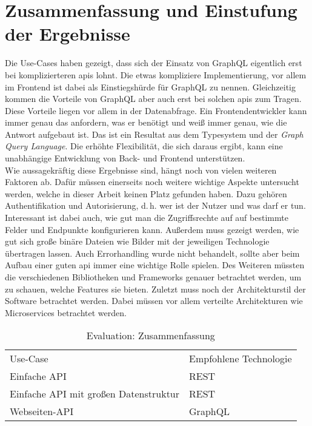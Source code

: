 \section{Zusammenfassung und Einstufung der Ergebnisse}

Die Use-Cases haben gezeigt, dass sich der Einsatz von GraphQL eigentlich erst bei komplizierteren \ac{api}s lohnt. Die etwas kompliziere Implementierung, vor allem im Frontend ist dabei als Einstiegshürde für GraphQL zu nennen. Gleichzeitig kommen die Vorteile von GraphQL aber auch erst bei solchen \ac{api}s zum Tragen. Diese Vorteile liegen vor allem in der Datenabfrage. Ein Frontendentwickler kann immer genau das anfordern, was er benötigt und weiß immer genau, wie die Antwort aufgebaut ist. Das ist ein Resultat aus dem Typesystem und der \textit{Graph Query Language}. Die erhöhte Flexibilität, die sich daraus ergibt, kann eine unabhängige Entwicklung von Back- und Frontend unterstützen. \\
Wie aussagekräftig diese Ergebnisse sind, hängt noch von vielen weiteren Faktoren ab. Dafür müssen einerseits noch weitere wichtige Aspekte untersucht werden, welche in dieser Arbeit keinen Platz gefunden haben. Dazu gehören Authentifikation und Autorisierung, d.\,h. wer ist der Nutzer und was darf er tun. Interessant ist dabei auch, wie gut man die Zugriffsrechte auf auf bestimmte Felder und Endpunkte konfigurieren kann. Außerdem muss gezeigt werden, wie gut sich große binäre Dateien wie Bilder mit der jeweiligen Technologie übertragen lassen. Auch Errorhandling wurde nicht behandelt, sollte aber beim Aufbau einer guten \ac{api} immer eine wichtige Rolle spielen. Des Weiteren müssten die verschiedenen Bibliotheken und Frameworks genauer betrachtet werden, um zu schauen, welche Features sie bieten. Zuletzt muss noch der Architekturstil der Software betrachtet werden. Dabei müssen vor allem verteilte Architekturen wie Microservices betrachtet werden.

\begin{table}[H]
\begin{tabular}{p{4cm} p{5cm}}
Use-Case & Empfohlene Technologie \\
Einfache API & REST \\
Einfache API mit großen Datenstruktur & REST \\
Webseiten-API &  GraphQL \\
\end{tabular}
\caption{Evaluation: Zusammenfassung}
\end{table}